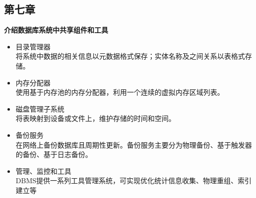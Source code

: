 \documentclass[UTF8,14pt]{article}
\numberwithin{figure}{section}
\begin{document}
\subsection{第七章}
\textbf{介绍数据库系统中共享组件和工具}
\begin{itemize}
      \item 目录管理器\\
            将系统中数据的相关信息以元数据格式保存；实体名称及之间关系以表格式存储。
      \item 内存分配器\\
            使用基于内存池的内存分配器，利用一个连续的虚拟内存区域列表。
      \item 磁盘管理子系统\\
            将表映射到设备或文件上，维护存储的时间和空间。
      \item 备份服务\\
            在网络上备份数据库且周期性更新。备份服务主要分为物理备份、基于触发器的备份、基于日志备份。
      \item 管理、监控和工具\\
            DBMS提供一系列工具管理系统，可实现优化统计信息收集、物理重组、索引建立等
\end{itemize}
\end{document}
